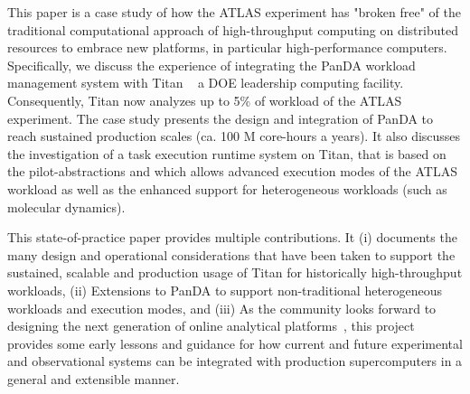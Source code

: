 This paper is a case study of how the ATLAS experiment has "broken free" of
the traditional computational approach of high-throughput computing on
distributed resources to embrace new platforms, in particular high-performance
computers. Specifically, we discuss the experience of integrating the PanDA
workload management system with Titan ~\textemdash{} a DOE leadership
computing facility. Consequently, Titan now analyzes up to 5\% of workload  of
the ATLAS experiment. The case study presents the design and integration of
PanDA to reach sustained production scales (ca. 100 M core-hours a years). It
also discusses the investigation of a task execution runtime system on Titan,
that is based on  the pilot-abstractions and which allows advanced execution
modes of the ATLAS workload as well as the enhanced support for heterogeneous
workloads (such as molecular dynamics).

This state-of-practice paper provides multiple contributions.  It (i)
documents the many design and operational considerations that have been  taken
to support the sustained, scalable and production usage of Titan for
historically high-throughput workloads, (ii) Extensions to PanDA to support
non-traditional heterogeneous workloads and execution modes,  and (iii) As the
community looks forward to designing the next generation of online analytical
platforms~\cite{foap}, this project provides some early lessons and guidance
for how current and future experimental and observational systems can be
integrated with production supercomputers in a general and extensible manner.




